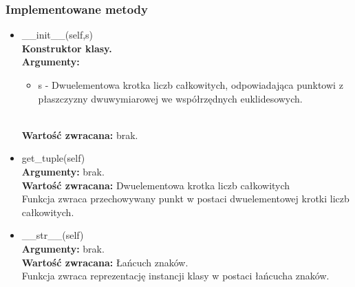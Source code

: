\documentclass{article}
\begin{document}
            \subsubsection{Implementowane metody}
                \begin{itemize}
                    \item \_\_init\_\_(self,s)\\
                        \textbf{Konstruktor klasy.} \\
                        \textbf{Argumenty:} \begin{itemize}
                            \item s - Dwuelementowa krotka liczb całkowitych, odpowiadająca punktowi z płaszczyzny dwuwymiarowej we współrzędnych euklidesowych.                        \end{itemize}\\
                        \textbf{Wartość zwracana:} brak.

                    
                    \item get\_tuple(self)\\
                        \textbf{Argumenty:} brak.\\
                        \textbf{Wartość zwracana:} Dwuelementowa krotka liczb całkowitych\\
                        Funkcja zwraca przechowywany punkt w postaci dwuelementowej krotki liczb całkowitych. 
                    
                    
                    \item \_\_str\_\_(self)\\
                        \textbf{Argumenty:} brak.\\
                        \textbf{Wartość zwracana:} Łańcuch znaków. \\
                        Funkcja zwraca reprezentację instancji klasy w postaci łańcucha znaków. 
                    
                \end{itemize}
\end{document}
